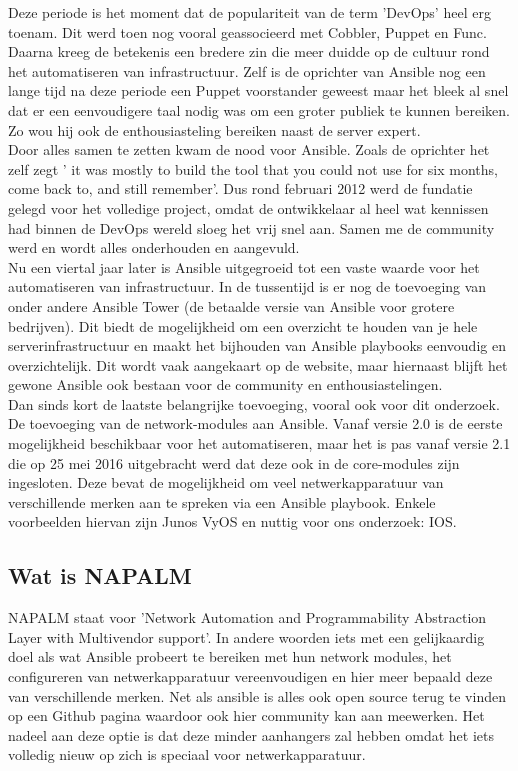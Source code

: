 Deze periode is het moment dat de populariteit van de term 'DevOps' heel erg toenam. Dit werd toen nog vooral geassocieerd met Cobbler, Puppet en Func. Daarna kreeg de betekenis een bredere zin die meer duidde op de cultuur rond het automatiseren van infrastructuur. 
Zelf is de oprichter van Ansible nog een lange tijd na deze periode een Puppet voorstander geweest maar het bleek al snel dat er een eenvoudigere taal nodig was om een groter publiek te kunnen bereiken. Zo wou hij ook de enthousiasteling bereiken naast de server expert.
\\

Door alles samen te zetten kwam de nood voor Ansible. Zoals de oprichter \textcite{historyAnsible}  het zelf zegt ' it was mostly to build the tool that you could not use for six months, come back to, and still remember'. Dus rond februari 2012 werd de fundatie gelegd voor het volledige project, omdat de ontwikkelaar al heel wat kennissen had binnen de DevOps wereld sloeg het vrij snel aan. Samen me de community werd en wordt alles onderhouden en aangevuld. \autocite{historyAnsible}
\\

Nu een viertal jaar later is Ansible uitgegroeid tot een vaste waarde voor het automatiseren van infrastructuur. In de tussentijd is er nog de toevoeging van onder andere Ansible Tower (de betaalde versie van Ansible voor grotere bedrijven). Dit biedt de mogelijkheid om een overzicht te houden van je hele serverinfrastructuur en maakt het bijhouden van Ansible playbooks eenvoudig en overzichtelijk. Dit wordt vaak aangekaart op de website, maar hiernaast blijft het gewone Ansible ook bestaan voor de community en enthousiastelingen. \autocite{ansibleTowerRelease}
\\

Dan sinds kort de laatste belangrijke toevoeging, vooral ook voor dit onderzoek. De toevoeging van de network-modules aan Ansible. Vanaf versie 2.0 is de eerste mogelijkheid beschikbaar voor het automatiseren, maar het is pas vanaf versie 2.1 die op 25 mei 2016 uitgebracht werd dat deze ook in de core-modules zijn ingesloten. Deze bevat de mogelijkheid om veel netwerkapparatuur van verschillende merken aan te spreken via een Ansible playbook. Enkele voorbeelden hiervan zijn Junos VyOS en nuttig voor ons onderzoek: IOS.
 \autocite{ansible2}\autocite{ansiblechangelog}
 
\subsection{Wat is NAPALM}
\label{sec:napalm}
NAPALM staat voor 'Network Automation and Programmability Abstraction Layer with Multivendor support'. In andere woorden iets met een gelijkaardig doel als wat Ansible probeert te bereiken met hun network modules, het configureren van netwerkapparatuur vereenvoudigen en hier meer bepaald deze van verschillende merken. Net als ansible is alles ook open source terug te vinden op een Github pagina waardoor ook hier community kan aan meewerken. Het nadeel aan deze optie is dat deze minder aanhangers zal hebben omdat het iets volledig nieuw op zich is speciaal voor netwerkapparatuur.\autocite{napalmGithub} 
\\

